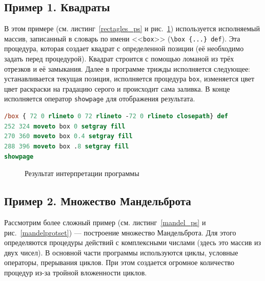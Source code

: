 \documentclass[14pt]{extarticle}
\begin{document}
\subsection{Пример 1. Квадраты}
В этом примере (см. листинг~\ref{rectagles_ps} и рис.~\ref{rectangles}) используется исполняемый массив, записанный в словарь по имени <<\texttt{box}>> (\texttt{\textbackslash box \{...\} def}). Эта процедура, которая создает квадрат с определенной позиции (её необходимо задать перед процедурой). Квадрат строится с помощью ломаной из трёх отрезков и её замыкания. Далее в программе трижды исполняется следующее: устанавливается текущая позиция, исполняется процедура \texttt{box}, изменяется цвет цвет раскраски на градацию серого и происходит сама заливка. В конце исполняется оператор \texttt{showpage} для отображения результата.
\begin{lstlisting}[label=rectagles_ps,caption=Три квадрата, frame = none, language = PostScript]
/box { 72 0 rlineto 0 72 rlineto -72 0 rlineto closepath} def
252 324 moveto box 0 setgray fill
270 360 moveto box 0.4 setgray fill
288 396 moveto box .8 setgray fill
showpage 
\end{lstlisting}
\begin{figure} [h]
\caption{Результат интерпретации программы}\label{rectangles}
\end{figure}

\subsection{Пример 2. Множество Мандельброта}
Рассмотрим более сложный пример (см. листинг~\ref{mandel_ps} и рис.~\ref{mandelprotset}) --- построение множество Мандельброта. Для этого определяются процедуры действий с комплексными числами (здесь это массив из двух чисел). В основной части программы используются циклы, условные операторы, прерывания циклов. При этом создается огромное количество процедур из-за тройной вложенности циклов.
\end{document}
